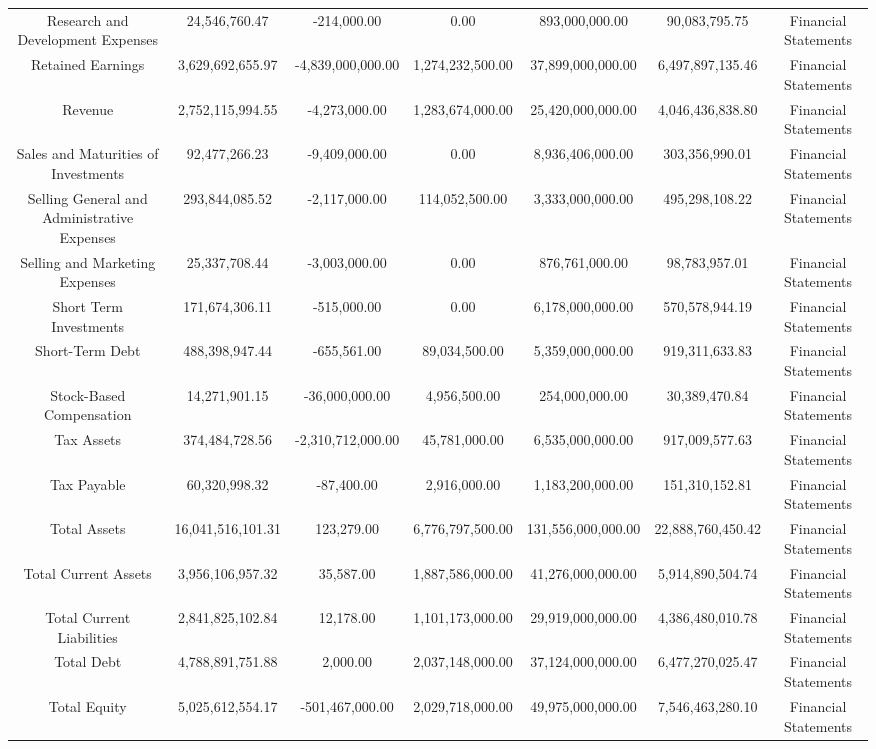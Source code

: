 \begin{longtable}{ccccccc}
Research and Development Expenses & 24,546,760.47 & -214,000.00 & 0.00 & 893,000,000.00 & 90,083,795.75 & Financial Statements \\
Retained Earnings & 3,629,692,655.97 & -4,839,000,000.00 & 1,274,232,500.00 & 37,899,000,000.00 & 6,497,897,135.46 & Financial Statements \\
Revenue & 2,752,115,994.55 & -4,273,000.00 & 1,283,674,000.00 & 25,420,000,000.00 & 4,046,436,838.80 & Financial Statements \\
Sales and Maturities of Investments & 92,477,266.23 & -9,409,000.00 & 0.00 & 8,936,406,000.00 & 303,356,990.01 & Financial Statements \\
Selling General and Administrative Expenses & 293,844,085.52 & -2,117,000.00 & 114,052,500.00 & 3,333,000,000.00 & 495,298,108.22 & Financial Statements \\
Selling and Marketing Expenses & 25,337,708.44 & -3,003,000.00 & 0.00 & 876,761,000.00 & 98,783,957.01 & Financial Statements \\
Short Term Investments & 171,674,306.11 & -515,000.00 & 0.00 & 6,178,000,000.00 & 570,578,944.19 & Financial Statements \\
Short-Term Debt & 488,398,947.44 & -655,561.00 & 89,034,500.00 & 5,359,000,000.00 & 919,311,633.83 & Financial Statements \\
Stock-Based Compensation & 14,271,901.15 & -36,000,000.00 & 4,956,500.00 & 254,000,000.00 & 30,389,470.84 & Financial Statements \\
Tax Assets & 374,484,728.56 & -2,310,712,000.00 & 45,781,000.00 & 6,535,000,000.00 & 917,009,577.63 & Financial Statements \\
Tax Payable & 60,320,998.32 & -87,400.00 & 2,916,000.00 & 1,183,200,000.00 & 151,310,152.81 & Financial Statements \\
Total Assets & 16,041,516,101.31 & 123,279.00 & 6,776,797,500.00 & 131,556,000,000.00 & 22,888,760,450.42 & Financial Statements \\
Total Current Assets & 3,956,106,957.32 & 35,587.00 & 1,887,586,000.00 & 41,276,000,000.00 & 5,914,890,504.74 & Financial Statements \\
Total Current Liabilities & 2,841,825,102.84 & 12,178.00 & 1,101,173,000.00 & 29,919,000,000.00 & 4,386,480,010.78 & Financial Statements \\
Total Debt & 4,788,891,751.88 & 2,000.00 & 2,037,148,000.00 & 37,124,000,000.00 & 6,477,270,025.47 & Financial Statements \\
Total Equity & 5,025,612,554.17 & -501,467,000.00 & 2,029,718,000.00 & 49,975,000,000.00 & 7,546,463,280.10 & Financial Statements \\

\end{longtable}
